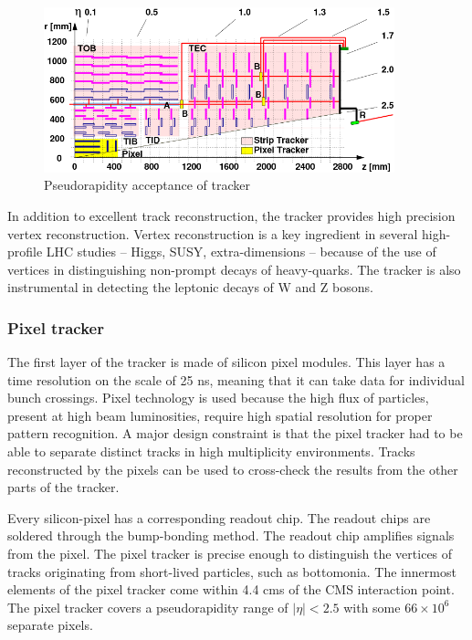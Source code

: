 \begin{figure}[h!]
\begin{centering}
\includegraphics[width=4in]{Chapter3/importfigs/cms_cft_09_003_fig1.png}
\par\end{centering}
\caption{Pseudorapidity acceptance of tracker \cite{Chatrchyan:2009sr} \label{fig:trackerYZ}}
\end{figure}

In addition to excellent track reconstruction, the tracker provides high precision vertex reconstruction. Vertex reconstruction is a key ingredient in several high-profile LHC studies -- Higgs, SUSY, extra-dimensions -- because of the use of vertices in distinguishing non-prompt decays of heavy-quarks. The tracker is also instrumental in detecting the leptonic decays of W and Z bosons. 

\subsubsection{Pixel tracker}

The first layer of the tracker is made of silicon pixel modules. This layer has a time resolution on the scale of 25 ns, meaning that it can take data for individual bunch crossings. Pixel technology is used because the high flux of particles, present at high beam luminosities, require high spatial resolution for proper pattern recognition. A major design constraint is that the pixel tracker had to be able to separate distinct tracks in high multiplicity environments. Tracks reconstructed by the pixels can be used to cross-check the results from the other parts of the tracker. 

Every silicon-pixel has a corresponding readout chip. The readout chips are soldered through the bump-bonding method. The readout chip amplifies signals from the pixel. The pixel tracker is precise enough to distinguish the vertices of tracks originating from short-lived particles, such as bottomonia. The innermost elements of the pixel tracker come within 4.4 cms of the CMS interaction point. The pixel tracker covers a pseudorapidity range of $|\eta|<2.5$ with some $66 \times 10^6$ separate pixels.

